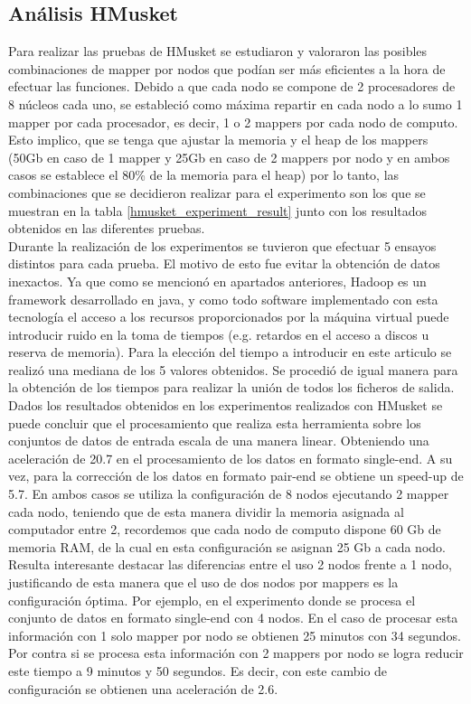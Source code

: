 \documentclass[conference]{IEEEtran}
\begin{document}
\subsection{Análisis HMusket}
Para realizar las pruebas de HMusket se estudiaron y valoraron las posibles combinaciones de mapper por nodos que podían ser más eficientes a la hora de efectuar las funciones. Debido a que cada nodo se compone de 2 procesadores de 8 núcleos cada uno, se estableció como máxima repartir en cada nodo a lo sumo 1 mapper por cada procesador, es decir, 1 o 2 mappers por cada nodo de computo. Esto implico, que se tenga que ajustar la memoria y el heap de los mappers (50Gb en caso de 1 mapper y 25Gb en caso de 2 mappers por nodo y en ambos casos se establece el 80\% de la memoria para el heap) por lo tanto, las combinaciones que se decidieron realizar para el experimento son los que se muestran en la tabla \ref{hmusket_experiment_result} junto con los resultados obtenidos en las diferentes pruebas.\\

Durante la realización de los experimentos se tuvieron que efectuar 5 ensayos distintos para cada prueba. El motivo de esto fue evitar la obtención de datos inexactos. Ya que como se mencionó en apartados anteriores, Hadoop es un framework desarrollado en java, y como todo software implementado con esta tecnología el acceso a los recursos proporcionados por la máquina virtual puede introducir ruido en la toma de tiempos (e.g. retardos en el acceso a discos u reserva de memoria). Para la elección del tiempo a introducir en este articulo se realizó una mediana de los 5 valores obtenidos. Se procedió de igual manera para la obtención de los tiempos para realizar la unión de todos los ficheros de salida.\\

Dados los resultados obtenidos en los experimentos realizados con HMusket se puede concluir que el procesamiento que realiza esta herramienta sobre los conjuntos de datos de entrada escala de una manera linear. Obteniendo una aceleración de 20.7 en el procesamiento de los datos en formato single-end. A su vez, para la corrección de los datos en formato pair-end se obtiene un speed-up de 5.7. En ambos casos se utiliza la configuración de 8 nodos ejecutando 2 mapper cada nodo, teniendo que de esta manera dividir la memoria asignada al computador entre 2, recordemos que cada nodo de computo dispone 60 Gb de memoria RAM, de la cual en esta configuración se asignan 25 Gb a cada nodo. Resulta interesante destacar las diferencias entre el uso 2 nodos frente a 1 nodo, justificando de esta manera que el uso de dos nodos por mappers es la configuración óptima. Por ejemplo, en el experimento donde se procesa el conjunto de datos en formato single-end con 4 nodos. En el caso de procesar esta información con 1 solo mapper por nodo se obtienen 25 minutos con 34 segundos. Por contra si se procesa esta información con 2 mappers por nodo se logra reducir este tiempo a  9 minutos y 50 segundos. Es decir, con este cambio de configuración se obtienen una aceleración de 2.6.\\
\end{document}
